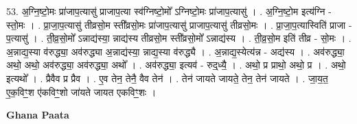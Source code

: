 \documentclass[17pt]{extarticle}
\begin{document}
53. अ॒ग्नि॒ष्टो॒मः प्रा॑जाप॒त्यासु॑ प्राजाप॒त्या स्व॑ग्निष्टो॒मो᳚ ऽग्निष्टो॒मः प्रा॑जाप॒त्यासु॑ । . अ॒ग्नि॒ष्टो॒म इत्य॑ग्नि - स्तो॒मः । . प्रा॒जा॒प॒त्यासु॑ तीव्रसो॒म स्ती᳚व्रसो॒मः प्रा॑जाप॒त्यासु॑ प्राजाप॒त्यासु॑ तीव्रसो॒मः । . प्रा॒जा॒प॒त्यास्विति॑ प्राजा - प॒त्यासु॑ । . ती॒व्र॒सो॒मो᳚ ऽन्नाद्य॑स्या॒ न्नाद्य॑स्य तीव्रसो॒म स्ती᳚व्रसो॒मो᳚ ऽन्नाद्य॑स्य । . ती॒व्र॒सो॒म इति॑ तीव्र - सो॒मः । . अ॒न्नाद्य॒स्या व॑रुद्ध्या॒ अव॑रुद्ध्या अ॒न्नाद्य॑स्या॒ न्नाद्य॒स्या व॑रुद्ध्यै । . अ॒न्नाद्य॒स्येत्य॑न्न - अद्य॑स्य । . अव॑रुद्ध्या॒ अथो॒ अथो॒ अव॑रुद्ध्या॒ अव॑रुद्ध्या॒ अथो᳚ । . अव॑रुद्ध्या॒ इत्यव॑ - रुद्॒ध्यै॒ । . अथो॒ प्र प्राथो॒ अथो॒ प्र । . अथो॒ इत्यथो᳚ । . प्रैवैव प्र प्रैव । . ए॒व तेन॒ तेनै॒ वैव तेन॑ । . तेन॑ जायते जायते॒ तेन॒ तेन॑ जायते । . जा॒य॒त॒ ए॒क॒विꣳ॒॒श ए॑कविꣳ॒॒शो जा॑यते जायत एकविꣳ॒॒शः । \newline

\textbf{Ghana Paata } \newline
\end{document}
